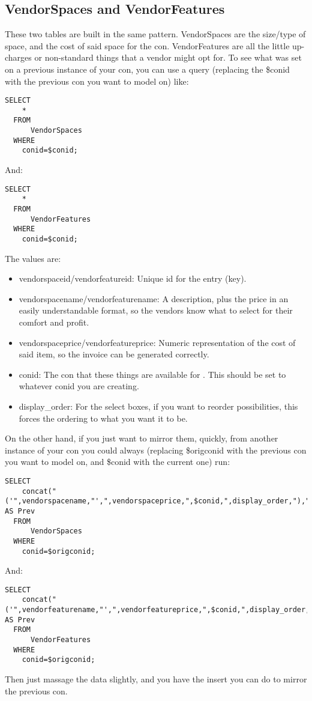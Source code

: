 \documentclass[captions=tablesignature]{scrartcl}
\begin{document}
\subsection{VendorSpaces and VendorFeatures}
\label{sec-13-1}
These two tables are built in the same pattern. VendorSpaces are
the size/type of space, and the cost of said space for the con.
VendorFeatures are all the little up-charges or non-standard things
that a vendor might opt for.  To see what was set on a previous
instance of your con, you can use a query (replacing the \$conid
with the previous con you want to model on) like:
\begin{verbatim}
SELECT
    *
  FROM
      VendorSpaces
  WHERE
    conid=$conid;
\end{verbatim}
And:
\begin{verbatim}
SELECT
    *
  FROM
      VendorFeatures
  WHERE
    conid=$conid;
\end{verbatim}
The values are:
\begin{itemize}
\item vendorspaceid/vendorfeatureid: Unique id for the entry (key).
\item vendorspacename/vendorfeaturename: A description, plus the price
in an easily understandable format, so the vendors know what to
select for their comfort and profit.
\item vendorspaceprice/vendorfeatureprice: Numeric representation of
the cost of said item, so the invoice can be generated
correctly.
\item conid: The con that these things are available for .  This should
be set to whatever conid you are creating.
\item display\_order: For the select boxes, if you want to reorder
possibilities, this forces the ordering to what you want it to
be.
\end{itemize}

On the other hand, if you just want to mirror them, quickly, from
another instance of your con you could always (replacing \$origconid
with the previous con you want to model on, and \$conid with the
current one) run:
\begin{verbatim}
SELECT
    concat("('",vendorspacename,"',",vendorspaceprice,",$conid,",display_order,"),") AS Prev
  FROM
      VendorSpaces
  WHERE
    conid=$origconid;
\end{verbatim}
And:
\begin{verbatim}
SELECT
    concat("('",vendorfeaturename,"',",vendorfeatureprice,",$conid,",display_order,"),") AS Prev
  FROM
      VendorFeatures
  WHERE
    conid=$origconid;
\end{verbatim}
Then just massage the data slightly, and you have the insert you
can do to mirror the previous con.
\end{document}
